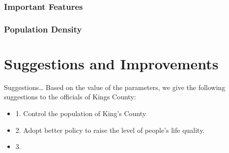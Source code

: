 \documentclass{beamer}
\begin{document}
\begin{frame}[fragile]
\frametitle{Important Features}
\begin{center}
\end{center}
\end{frame}


\begin{frame}[fragile]
\frametitle{Population Density}
\begin{center}
\end{center}
\end{frame}

\section{Suggestions and Improvements}
\begin{frame}{Suggestions\dots{}}
Based on the value of the parameters, we give the following suggestions to the officials of Kings County:
\begin{itemize}
\item 1. Control the population of King's County
\item 2. Adopt better policy to raise the level of people's life quality.
\item 3.
\end{itemize}

\end{frame}
\end{document}
